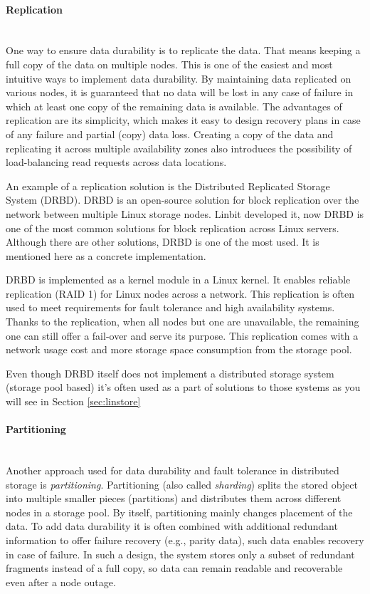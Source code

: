\paragraph{Replication} \mbox{} \\
One way to ensure data durability is to replicate the data. That means keeping a full copy of the data on multiple nodes. This is one of the easiest and most intuitive ways to implement data durability. By maintaining data replicated on various nodes, it is guaranteed that no data will be lost in any case of failure in which at least one copy of the remaining data is available. The advantages of replication are its simplicity, which makes it easy to design recovery plans in case of any failure and partial (copy) data loss. Creating a copy of the data and replicating it across multiple availability zones also introduces the possibility of load-balancing read requests across data locations.\cite{kleppmann_designing_2017, liu_evaluation_2018}

An example of a replication solution is the Distributed Replicated Storage System (DRBD). DRBD is an open-source solution for block replication over the network between multiple Linux storage nodes. Linbit developed it, now DRBD is one of the most common solutions for block replication across Linux servers. Although there are other solutions, DRBD is one of the most used. It is mentioned here as a concrete implementation.

DRBD is implemented as a kernel module in a Linux kernel. It enables reliable replication (RAID 1) for Linux nodes across a network. This replication is often used to meet requirements for fault tolerance and high availability systems. Thanks to the replication, when all nodes but one are unavailable, the remaining one can still offer a fail-over and serve its purpose. This replication comes with a network usage cost and more storage space consumption from the storage pool. \cite{linbit_drbd9_2025}

Even though DRBD itself does not implement a distributed storage system (storage pool based) it's often used as a part of solutions to those systems as you will see in Section \ref{sec:linstore}

\paragraph{Partitioning} \mbox{} \\
Another approach used for data durability and fault tolerance in distributed storage is \emph{partitioning}. Partitioning (also called \emph{sharding}) splits the stored object into multiple smaller pieces (partitions) and distributes them across different nodes in a storage pool. By itself, partitioning mainly changes placement of the data. To add data durability it is often combined with additional redundant information to offer failure recovery (e.g., parity data), such data enables recovery in case of failure. In such a design, the system stores only a subset of redundant fragments instead of a full copy, so data can remain readable and recoverable even after a node outage. \cite{purestorage_what_2025}

